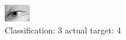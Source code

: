 \begin{figure}[h!]
\begin{center}
\includegraphics[width=0.60\columnwidth]{figures/ID3033_class_3_target_4.png}
\end{center}
\caption{ Classification: 3 actual target: 4}
\label{fig:ID3033_class_3_target_4}
\end{figure}
